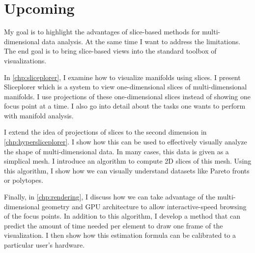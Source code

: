 
\section{Upcoming}
\label{sec:thesis_outline}

My goal is to highlight the advantages of slice-based methods for
multi-dimensional data analysis. At the same time I want to address the
limitations. The end goal is to bring slice-based views into the standard
toolbox of visualizations.

In \autoref{chp:sliceplorer}, I examine how to visualize manifolds using
slices. I present Sliceplorer which is a system to view one-dimensional slices
of multi-dimensional manifolds. I use projections of these one-dimensional
slices instead of showing one focus point at a time. I also go into detail
about the tasks one wants to perform with manifold analysis.

I extend the idea of projections of slices to the second dimension in
\autoref{chp:hypersliceplorer}.  I show how this can be used to effectively
visually analyze the shape of multi-dimensional data. In many cases, this data
is given as a simplical mesh. I introduce an algorithm to compute 2D slices of
this mesh.  Using this algorithm, I show how we can visually understand
datasets like Pareto fronts or polytopes.

Finally, in \autoref{chp:rendering}, I discuss how we can take advantage of the
multi-dimensional geometry and GPU architecture to allow interactive-speed
browsing of the focus points. In addition to this algorithm, I develop a method
that can predict the amount of time needed per element to draw one frame of the
visualization. I then show how this estimation formula can be calibrated to a
particular user's hardware.

